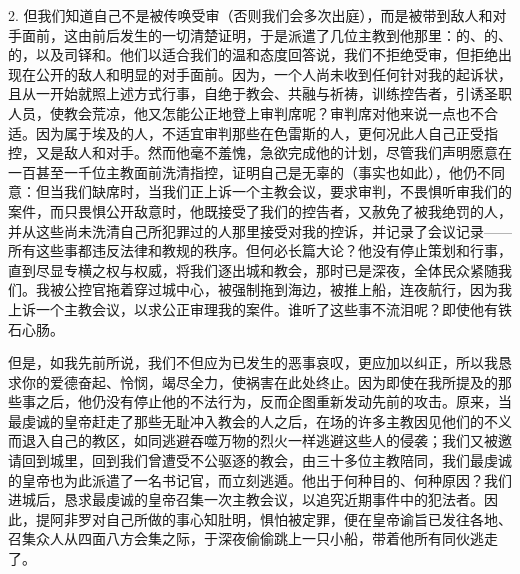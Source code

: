 2. 但我们知道自己不是被传唤受审（否则我们会多次出庭），而是被带到敌人和对手面前，这由前后发生的一切清楚证明，于是派遣了几位主教到他那里：的、的、的，以及司铎和。他们以适合我们的温和态度回答说，我们不拒绝受审，但拒绝出现在公开的敌人和明显的对手面前。因为，一个人尚未收到任何针对我的起诉状，且从一开始就照上述方式行事，自绝于教会、共融与祈祷，训练控告者，引诱圣职人员，使教会荒凉，他又怎能公正地登上审判席呢？审判席对他来说一点也不合适。因为属于埃及的人，不适宜审判那些在色雷斯的人，更何况此人自己正受指控，又是敌人和对手。然而他毫不羞愧，急欲完成他的计划，尽管我们声明愿意在一百甚至一千位主教面前洗清指控，证明自己是无辜的（事实也如此），他仍不同意：但当我们缺席时，当我们正上诉一个主教会议，要求审判，不畏惧听审我们的案件，而只畏惧公开敌意时，他既接受了我们的控告者，又赦免了被我绝罚的人，并从这些尚未洗清自己所犯罪过的人那里接受对我的控诉，并记录了会议记录——所有这些事都违反法律和教规的秩序。但何必长篇大论？他没有停止策划和行事，直到尽显专横之权与权威，将我们逐出城和教会，那时已是深夜，全体民众紧随我们。我被公控官拖着穿过城中心，被强制拖到海边，被推上船，连夜航行，因为我上诉一个主教会议，以求公正审理我的案件。谁听了这些事不流泪呢？即使他有铁石心肠。\par

但是，如我先前所说，我们不但应为已发生的恶事哀叹，更应加以纠正，所以我恳求你的爱德奋起、怜悯，竭尽全力，使祸害在此处终止。因为即使在我所提及的那些事之后，他仍没有停止他的不法行为，反而企图重新发动先前的攻击。原来，当最虔诚的皇帝赶走了那些无耻冲入教会的人之后，在场的许多主教因见他们的不义而退入自己的教区，如同逃避吞噬万物的烈火一样逃避这些人的侵袭；我们又被邀请回到城里，回到我们曾遭受不公驱逐的教会，由三十多位主教陪同，我们最虔诚的皇帝也为此派遣了一名书记官，而立刻逃遁。他出于何种目的、何种原因？我们进城后，恳求最虔诚的皇帝召集一次主教会议，以追究近期事件中的犯法者。因此，提阿非罗对自己所做的事心知肚明，惧怕被定罪，便在皇帝谕旨已发往各地、召集众人从四面八方会集之际，于深夜偷偷跳上一只小船，带着他所有同伙逃走了。\par

